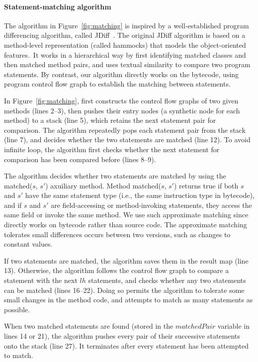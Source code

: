 \paragraph{Statement-matching algorithm}

The algorithm in Figure~\ref{fig:matching} is inspired by
a well-established program differencing algorithm, called
JDiff~\cite{Apiwattanapong:2004}. The original JDiff
algorithm is based on a method-level representation
(called hammocks) that models the object-oriented features.\
It works in a hierarchical way by first identifying matched
classes and then matched method pairs, and uses
textual similarity to compare two program statements. By contrast, our
algorithm directly works on the bytecode, using program control flow graph
to establish the matching between statements.

In Figure~\ref{fig:matching}, \ourtool first constructs the control
flow graphs of two given methods (lines 2--3), then pushes their
entry nodes (a synthetic node for each method) to a stack (line 5), which retains
the next statement pair for comparison. The algorithm repeatedly
pops each statement pair from the stack (line 7), and
decides whether the two statements are matched (line 12).  To avoid infinite
loop, the algorithm first checks whether the next statement for comparison
has been compared before (lines 8--9). 

The algorithm decides whether two statements are matched by using
the matched($\mathit{s}$, $\mathit{s'}$) axuiliary method. Method
matched($\mathit{s}$, $\mathit{s'}$) returns true if both
$\mathit{s}$ and $\mathit{s'}$ have the same statement type (i.e.,
the same instruction type in bytecode), and if $\mathit{s}$ and
$\mathit{s'}$ are field-accessing or method-invoking statements,
they access the same field or invoke the same method.
We use such approximate matching since \ourtool directly works
on bytecode rather than source code. The approximate matching
tolerates small differences
occurs between two versions, such as changes to constant values.


If two statements are matched, the algorithm saves them in the
result map (line 13). Otherwise,
the algorithm follows the control flow graph to compare a statement with
the next $lh$ statements, and checks whether any two statements can be
matched (lines 16--22). Doing so permits the algorithm to tolerate some small
changes in the method code, and attempts to match as many statements as possible.

When two matched statements are found  (stored in
the $\mathit{matchedPair}$ variable in lines 14 or 21),
the algorithm pushes every pair of
their successive statements onto the stack (line 27).
It terminates after every statement has been attempted to match.


